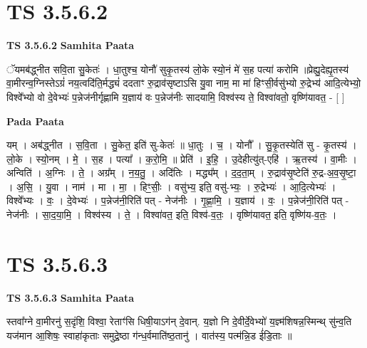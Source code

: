 \documentclass[17pt]{extarticle}
\begin{document}

\section{ TS 3.5.6.2 }

\textbf{TS 3.5.6.2 } \newline
\textbf{Samhita Paata} \newline

ॅयमब॑द्ध्नीत सवि॒ता सु॒केतः॑ । धा॒तुश्च॒ योनौ॑ सुकृ॒तस्य॑ लो॒के स्यो॒नं मे॑ स॒ह पत्या॑ करोमि ॥प्रेह्यु॒देह्यृ॒तस्य॑ वा॒मीरन्व॒ग्निस्तेऽग्रं॑ नय॒त्वदि॑ति॒र्मद्ध्यं॑ ददताꣳ रु॒द्राव॑सृष्टाऽसि यु॒वा नाम॒ मा मा॑ हिꣳसी॒र्वसु॑भ्यो रु॒द्रेभ्य॑ आदि॒त्येभ्यो॒ विश्वे᳚भ्यो वो दे॒वेभ्यः॑ प॒न्नेज॑नीर्गृह्णामि य॒ज्ञाय॑ वः प॒न्नेज॑नीः सादयामि॒ विश्व॑स्य ते॒ विश्वा॑वतो॒ वृष्णि॑यावत॒ - [  ] \newline

\textbf{Pada Paata} \newline

यम् । अब॑द्ध्नीत । स॒वि॒ता । सु॒केत॒ इति॑ सु-केतः॑ ॥ धा॒तुः । च॒ । योनौ᳚ । सु॒कृ॒तस्येति॑ सु - कृ॒तस्य॑ । लो॒के । स्यो॒नम् । मे॒ । स॒ह । पत्या᳚ । क॒रो॒मि॒ ॥ प्रेति॑ । इ॒हि॒ । उ॒देहीत्यु॑त्-एहि॑ । ऋ॒तस्य॑ । वा॒मीः । अन्विति॑ । अ॒ग्निः । ते॒ । अग्र᳚म् । न॒य॒तु॒ । अदि॑तिः । मद्ध्य᳚म् । द॒द॒ता॒म् । रु॒द्राव॑सृ॒ष्टेति॑ रु॒द्र-अ॒व॒सृ॒ष्टा॒ । अ॒सि॒ । यु॒वा । नाम॑ । मा । मा॒ । हिꣳ॒॒सीः॒ । वसु॑भ्य॒ इति॒ वसु॑-भ्यः॒ । रु॒द्रेभ्यः॑ । आ॒दि॒त्येभ्यः॑ । विश्वे᳚भ्यः । वः॒ । दे॒वेभ्यः॑ । प॒न्नेज॑नी॒रिति॑ पत् - नेज॑नीः । गृ॒ह्णा॒मि॒ । य॒ज्ञाय॑ । वः॒ । प॒न्नेज॑नी॒रिति॑ पत् - नेज॑नीः । सा॒द॒या॒मि॒ । विश्व॑स्य । ते॒ । विश्वा॑वत॒ इति॒ विश्व॑-व॒तः॒ । वृष्णि॑यावत॒ इति॒ वृष्णि॑य-व॒तः॒ ।  \newline





\section{ TS 3.5.6.3 }

\textbf{TS 3.5.6.3 } \newline
\textbf{Samhita Paata} \newline

स्तवा᳚ग्ने वा॒मीरनु॑ स॒दृंशि॒ विश्वा॒ रेताꣳ॑सि धिषी॒याऽग॑न् दे॒वान्. य॒ज्ञो नि दे॒वीर्दे॒वेभ्यो॑ य॒ज्ञ्म॑शिषन्न॒स्मिन्थ् सु॑न्व॒ति यज॑मान आ॒शिषः॒ स्वाहा॑कृताः समुद्रे॒ष्ठा ग॑न्ध॒र्वमाति॑ष्ठ॒तानु॑ । वात॑स्य॒ पत्म॑न्नि॒ड ई॑डि॒ताः ॥ \newline
\end{document}

